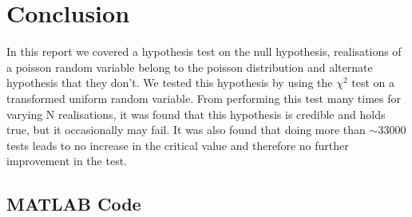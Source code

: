 \documentclass[a4paper, 12pt]{article}
\begin{document}
    \section{Conclusion}
        In this report we covered a hypothesis test on the null hypothesis, realisations of a poisson random variable belong to the poisson distribution and alternate hypothesis that they don't. We tested this hypothesis by using the $\chi^2$ test on a transformed uniform random variable. From performing this test many times for varying N realisations, it was found that this hypothesis is credible and holds true, but it occasionally may fail. It was also found that doing more than $\sim 33000$ tests leads to no increase in the critical value and therefore no further improvement in the test.


    \begin{appendices}
        \section{MATLAB Code}
            
    \end{appendices}
\end{document}
